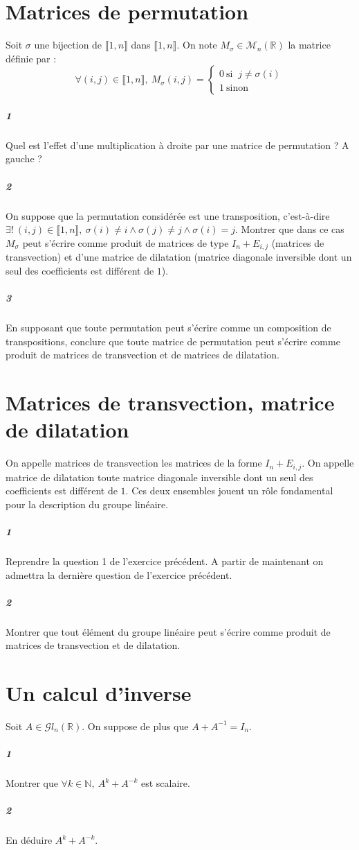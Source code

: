 \documentclass[10pt,a4paper]{article}
\begin{document}
\section{Matrices de permutation}
Soit $\sigma$ une bijection de $\llbracket 1,n \rrbracket$ dans $\llbracket 1,n \rrbracket$. On note $M_{\sigma} \in \mathcal{M}_n\left( \mathbb{R} \right)$ la matrice définie par :
\begin{equation*}
\forall (i,j) \in \llbracket 1,n \rrbracket, \ M_{\sigma}(i,j) = \left\lbrace \begin{matrix} 0 \ \text{si } \ j \neq \sigma(i) \\ 
1 \ \text{sinon}\end{matrix} \right.
\end{equation*}
\subparagraph{1}Quel est l'effet d'une multiplication à droite par une matrice de permutation ? A gauche ?
\subparagraph{2}On suppose que la permutation considérée est une transposition, c'est-à-dire $\exists! \ (i,j) \in \llbracket 1,n \rrbracket, \ \sigma(i) \neq i \wedge \sigma(j) \neq j \wedge \sigma(i)=j$. Montrer que dans ce cas $M_{\sigma}$ peut s'écrire comme produit de matrices de type $I_n+E_{i,j}$ (matrices de transvection) et d'une matrice de dilatation (matrice diagonale inversible dont un seul des coefficients est différent de $1$).
\subparagraph{3}En supposant que toute permutation peut s'écrire comme un composition de transpositions, conclure que toute matrice de permutation peut s'écrire comme produit de matrices de transvection et de matrices de dilatation.

\section{Matrices de transvection, matrice de dilatation}
On appelle matrices de transvection les matrices de la forme $I_n+E_{i,j}$. On appelle matrice de dilatation toute matrice diagonale inversible dont un seul des coefficients est différent de $1$. Ces deux ensembles jouent un rôle fondamental pour la description du groupe linéaire.
\subparagraph{1}Reprendre la question 1 de l'exercice précédent. A partir de maintenant on admettra la dernière question de l'exercice précédent.
\subparagraph{2}Montrer que tout élément du groupe linéaire peut s'écrire comme produit de matrices de transvection et de dilatation.

\section{Un calcul d'inverse}
Soit $A \in \mathcal{G}l_n\left( \mathbb{R} \right)$. On suppose de plus que $A+A^{-1}=I_n$.
\subparagraph{1}Montrer que $\forall k \in \mathbb{N}, \ A^k+A^{-k}$ est scalaire.
\subparagraph{2}En déduire $A^k+A^{-k}$.
\end{document}
